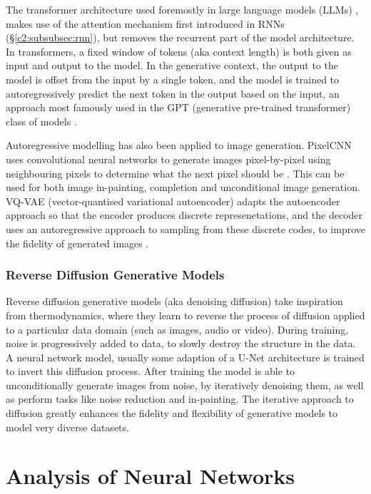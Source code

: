 The transformer architecture used foremostly in large language models (LLMs) \citep{vaswani2017attention}, makes use of the attention mechanism first introduced in RNNs \citep{bahdanau2014neural} (\S \ref{c2:subsubsec:rnn}), but removes the recurrent part of the model architecture.
In transformers, a fixed window of tokens (aka context length) is both given as input and output to the model.
In the generative context, the output to the model is offset from the input by a single token, and the model is trained to autoregressively predict the next token in the output based on the input, an approach most famously used in the GPT (generative pre-trained transformer) class of models \citep{radford2018improving, radford2019language,brown2020language}.

Autoregressive modelling has also been applied to image generation.
PixelCNN uses convolutional neural networks to generate images pixel-by-pixel using neighbouring pixels to determine what the next pixel should be \citep{van2016conditional}.
This can be used for both image in-painting, completion and unconditional image generation.
VQ-VAE (vector-quantised variational autoencoder) adapts the autoencoder approach so that the encoder produces discrete represenetations, and the decoder uses an autoregressive approach to sampling from these discrete codes, to improve the fidelity of generated images \citep{van2017neural}. 

\subsubsection{Reverse Diffusion Generative Models}
\label{c2:subsubsec:diffusion}

Reverse diffusion generative models (aka denoising diffusion) take inspiration from thermodynamics, where they learn to reverse the process of diffusion applied to a particular data domain \citep{sohl2015deep} (such as images, audio or video). 
During training, noise is progressively added to data, to slowly destroy the structure in the data.
A neural network model, usually some adaption of a U-Net architecture \citep{ronneberger2015u} is trained to invert this diffusion process.
After training the model is able to unconditionally generate images from noise, by iteratively denoising them, as well as perform tasks like noise reduction and in-painting. 
The iterative approach to diffusion greatly enhances the fidelity and flexibility of generative models to model very diverse datasets.

\section{Analysis of Neural Networks} 

